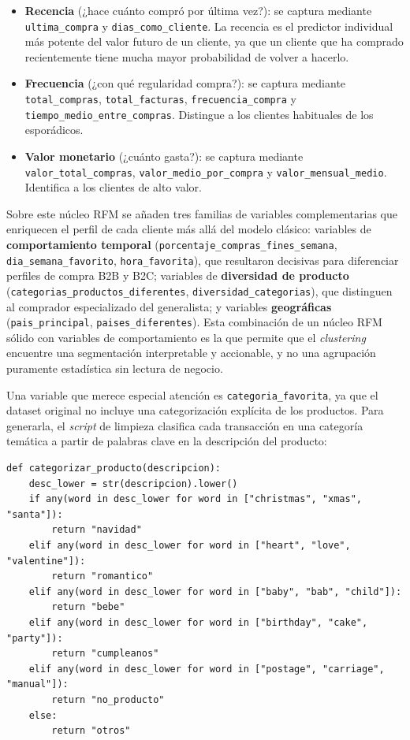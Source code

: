\documentclass[11pt,a4paper]{article}
\begin{document}
\begin{itemize}
    \item \textbf{Recencia} (¿hace cuánto compró por última vez?): se captura mediante \texttt{ultima\_compra} y \texttt{dias\_como\_cliente}. La recencia es el predictor individual más potente del valor futuro de un cliente, ya que un cliente que ha comprado recientemente tiene mucha mayor probabilidad de volver a hacerlo.
    \item \textbf{Frecuencia} (¿con qué regularidad compra?): se captura mediante \texttt{total\_compras}, \texttt{total\_facturas}, \texttt{frecuencia\_compra} y \texttt{tiempo\_medio\_entre\_compras}. Distingue a los clientes habituales de los esporádicos.
    \item \textbf{Valor monetario} (¿cuánto gasta?): se captura mediante \texttt{valor\_total\_compras}, \texttt{valor\_medio\_por\_compra} y \texttt{valor\_mensual\_medio}. Identifica a los clientes de alto valor.
\end{itemize}

Sobre este núcleo RFM se añaden tres familias de variables complementarias que enriquecen el perfil de cada cliente más allá del modelo clásico: variables de \textbf{comportamiento temporal} (\texttt{porcentaje\_compras\_fines\_semana}, \texttt{dia\_semana\_favorito}, \texttt{hora\_favorita}), que resultaron decisivas para diferenciar perfiles de compra B2B y B2C; variables de \textbf{diversidad de producto} (\texttt{categorias\_productos\_diferentes}, \texttt{diversidad\_categorias}), que distinguen al comprador especializado del generalista; y variables \textbf{geográficas} (\texttt{pais\_principal}, \texttt{paises\_diferentes}). Esta combinación de un núcleo RFM sólido con variables de comportamiento es la que permite que el \textit{clustering} encuentre una segmentación interpretable y accionable, y no una agrupación puramente estadística sin lectura de negocio.

Una variable que merece especial atención es \texttt{categoria\_favorita}, ya que el dataset original no incluye una categorización explícita de los productos. Para generarla, el \textit{script} de limpieza clasifica cada transacción en una categoría temática a partir de palabras clave en la descripción del producto:

\begin{lstlisting}
def categorizar_producto(descripcion):
    desc_lower = str(descripcion).lower()
    if any(word in desc_lower for word in ["christmas", "xmas", "santa"]):
        return "navidad"
    elif any(word in desc_lower for word in ["heart", "love", "valentine"]):
        return "romantico"
    elif any(word in desc_lower for word in ["baby", "bab", "child"]):
        return "bebe"
    elif any(word in desc_lower for word in ["birthday", "cake", "party"]):
        return "cumpleanos"
    elif any(word in desc_lower for word in ["postage", "carriage", "manual"]):
        return "no_producto"
    else:
        return "otros"
\end{lstlisting}
\end{document}

